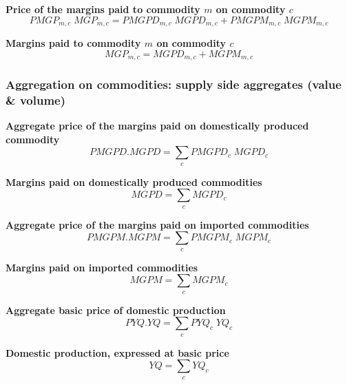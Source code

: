 \documentclass[12pt]{article}
\numberwithin{equation}{section}
\begin{document}
\noindent\textbf{Price of the margins paid to commodity $m$ on commodity $c$} \\
\begin{dmath}
PMGP_{m, c} \; MGP_{m, c} = PMGPD_{m, c} \; MGPD_{m, c} + PMGPM_{m, c} \; MGPM_{m, c}
\end{dmath}

\noindent\textbf{Margins paid to commodity $m$ on commodity $c$} \\
\begin{dmath}
MGP_{m, c} = MGPD_{m, c} + MGPM_{m, c}
\end{dmath}




\subsubsection{Aggregation on commodities: supply side aggregates (value \& volume)}



\noindent\textbf{Aggregate price of the margins paid on domestically produced commodity} \\
\begin{dmath}
PMGPD . MGPD = \sum_{c} PMGPD_{c} \; MGPD_{c}
\end{dmath}

\noindent\textbf{Margins paid on domestically produced commodities} \\
\begin{dmath}
MGPD = \sum_{c} MGPD_{c}
\end{dmath}

\noindent\textbf{Aggregate price of the margins paid on imported commodities} \\
\begin{dmath}
PMGPM . MGPM = \sum_{c} PMGPM_{c} \; MGPM_{c}
\end{dmath}

\noindent\textbf{Margins paid on imported commodities} \\
\begin{dmath}
MGPM = \sum_{c} MGPM_{c}
\end{dmath}

\noindent\textbf{Aggregate basic price of domestic production} \\
\begin{dmath}
PYQ . YQ = \sum_{c} PYQ_{c} \; YQ_{c}
\end{dmath}

\noindent\textbf{Domestic production, expressed at basic price} \\
\begin{dmath}
YQ = \sum_{c} YQ_{c}
\end{dmath}
\end{document}
